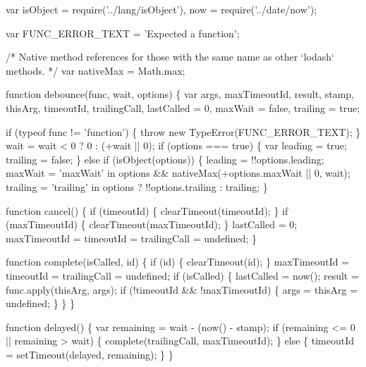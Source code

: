 \begin{DoxyCodeInclude}
var isObject = require(\textcolor{stringliteral}{'../lang/isObject'}),
    now = require(\textcolor{stringliteral}{'../date/now'});

var FUNC\_ERROR\_TEXT = \textcolor{stringliteral}{'Expected a function'};

\textcolor{comment}{/* Native method references for those with the same name as other `lodash` methods. */}
var nativeMax = Math.max;

\textcolor{keyword}{function} debounce(func, wait, options) \{
  var args,
      maxTimeoutId,
      result,
      stamp,
      thisArg,
      timeoutId,
      trailingCall,
      lastCalled = 0,
      maxWait = \textcolor{keyword}{false},
      trailing = \textcolor{keyword}{true};

  \textcolor{keywordflow}{if} (typeof func != \textcolor{stringliteral}{'function'}) \{
    \textcolor{keywordflow}{throw} \textcolor{keyword}{new} TypeError(FUNC\_ERROR\_TEXT);
  \}
  wait = wait < 0 ? 0 : (+wait || 0);
  \textcolor{keywordflow}{if} (options === \textcolor{keyword}{true}) \{
    var leading = \textcolor{keyword}{true};
    trailing = \textcolor{keyword}{false};
  \} \textcolor{keywordflow}{else} \textcolor{keywordflow}{if} (isObject(options)) \{
    leading = !!options.leading;
    maxWait = \textcolor{stringliteral}{'maxWait'} in options && nativeMax(+options.maxWait || 0, wait);
    trailing = \textcolor{stringliteral}{'trailing'} in options ? !!options.trailing : trailing;
  \}

  \textcolor{keyword}{function} cancel() \{
    \textcolor{keywordflow}{if} (timeoutId) \{
      clearTimeout(timeoutId);
    \}
    \textcolor{keywordflow}{if} (maxTimeoutId) \{
      clearTimeout(maxTimeoutId);
    \}
    lastCalled = 0;
    maxTimeoutId = timeoutId = trailingCall = undefined;
  \}

  \textcolor{keyword}{function} complete(isCalled, \textcolor{keywordtype}{id}) \{
    \textcolor{keywordflow}{if} (\textcolor{keywordtype}{id}) \{
      clearTimeout(\textcolor{keywordtype}{id});
    \}
    maxTimeoutId = timeoutId = trailingCall = undefined;
    \textcolor{keywordflow}{if} (isCalled) \{
      lastCalled = now();
      result = func.apply(thisArg, args);
      \textcolor{keywordflow}{if} (!timeoutId && !maxTimeoutId) \{
        args = thisArg = undefined;
      \}
    \}
  \}

  \textcolor{keyword}{function} delayed() \{
    var remaining = wait - (now() - stamp);
    \textcolor{keywordflow}{if} (remaining <= 0 || remaining > wait) \{
      complete(trailingCall, maxTimeoutId);
    \} \textcolor{keywordflow}{else} \{
      timeoutId = setTimeout(delayed, remaining);
    \}
  \}


\end{DoxyCodeInclude}
